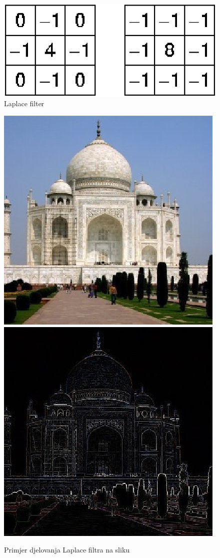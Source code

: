 \documentclass[times, utf8, diplomski]{fer}
\begin{document}
\begin{figure}[htbp]
    \centering
    \includegraphics[scale=1]{Slike/laplace}
    \caption{Laplace filter \cite{laplace}}
\end{figure}

\begin{figure}[htbp]
    \centering
    \includegraphics[scale=0.75]{Slike/taj_orig}
    \includegraphics[scale=0.75]{Slike/edge-taj-laplace}
    \caption{Primjer djelovanja Laplace filtra na sliku \cite{laplaceexample}}
\end{figure}
\end{document}
